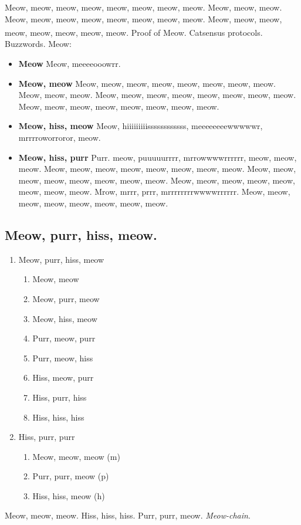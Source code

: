 \documentclass[9pt,oneside]{amsart}
\newcommand*\lipsumeow{Meow, meow, meow, meow, meow, meow, meow, meow.  Meow, meow, meow. Meow, meow, meow, meow, meow, meow, meow, meow. Meow, meow, meow, meow, meow, meow, meow, meow. }
\newcommand*\lipsumeowpurr{Purr. meow, puuuuurrrr, mrrowwwwrrrrrr, meow, meow, meow. Meow, meow, meow, meow, meow, meow, meow, meow. Meow, meow, meow, meow, meow, meow, meow, meow. Meow, meow, meow, meow, meow, meow, meow, meow. Mrow, mrrr, prrr, mrrrrrrrrwwwwrrrrrr. Meow, meow, meow, meow, meow, meow, meow, meow.}
\newcommand*\lipsumhiss{Meow, hiiiiiiiiissssssssssss, meeeeeeeewwwwwr, mrrrroworroror, meow.}
\begin{document}
\begin{multicols}{2}
 \lipsumeow{} Proof of Meow.\textsuperscript{\textregistered} Catsensus protocols. Buzzwords. Meow:
 
\begin{itemize}
 \item \textbf{Meow}  Meow, meeeeooowrr.
 \item  \textbf{Meow, meow} \lipsumeow{}
 \item  \textbf{Meow, hiss, meow} \lipsumhiss{}
 \item  \textbf{Meow, hiss, purr} \lipsumeowpurr{}
\end{itemize}
 
\subsection{Meow, purr, hiss, meow.}\label{subsec:decentral_security_scalable}

\begin{enumerate}
   \item Meow, purr, hiss, meow
       \begin{enumerate}
          \item Meow, meow
          \item Meow, purr, meow
          \item Meow, hiss, meow
          \item Purr, meow, purr
          \item Purr, meow, hiss
          \item Hiss, meow, purr
          \item Hiss, purr, hiss
          \item Hiss, hiss, hiss
       \end{enumerate}  
   \item Hiss, purr, purr
       \begin{enumerate}
          \item Meow, meow, meow (m)
          \item Purr, purr, meow (p)
          \item Hiss, hiss, meow (h)
       \end{enumerate}
\end{enumerate}
 
Meow, meow, meow. Hiss, hiss, hiss. Purr, purr, meow. \textit{Meow-chain}.  


\end{multicols}
\end{document}
